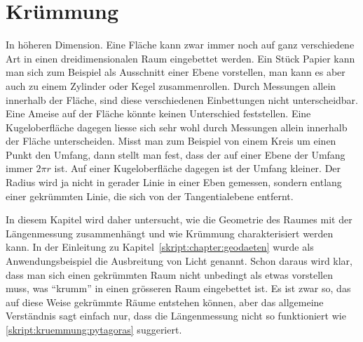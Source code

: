 %
%
%
\chapter{Krümmung%
\label{skript:chapter:kruemmung}}
\rhead{}

In höheren Dimension.
Eine Fläche kann zwar immer noch auf ganz verschiedene Art in
einen dreidimensionalen Raum eingebettet werden.
Ein Stück Papier kann man sich zum Beispiel als Ausschnitt einer
Ebene vorstellen, man kann es aber auch zu einem Zylinder oder
Kegel zusammenrollen.
Durch Messungen allein innerhalb der Fläche, sind diese verschiedenen
Einbettungen nicht unterscheidbar.
Eine Ameise auf der Fläche könnte keinen Unterschied feststellen.
Eine Kugeloberfläche dagegen liesse sich sehr wohl durch Messungen
allein innerhalb der Fläche unterscheiden.
Misst man zum Beispiel von einem Kreis um einen Punkt den Umfang,
dann stellt man fest, dass der auf einer Ebene der Umfang immer $2\pi r$ ist.
Auf einer Kugeloberfläche dagegen ist der Umfang kleiner.
Der Radius wird ja nicht in gerader Linie in einer Eben gemessen,
sondern entlang einer gekrümmten Linie, die sich von der Tangentialebene
entfernt.

In diesem Kapitel wird daher untersucht, wie die Geometrie des Raumes
mit der Längenmessung zusammenhängt und wie Krümmung charakterisiert
werden kann.
In der Einleitung zu Kapitel~\ref{skript:chapter:geodaeten} wurde
als Anwendungsbeispiel die Ausbreitung von Licht genannt.
Schon daraus wird klar, dass man sich einen gekrümmten
Raum nicht unbedingt als etwas vorstellen muss, was ``krumm'' in einen
grösseren Raum eingebettet ist. 
Es ist zwar so, das auf diese Weise gekrümmte Räume entstehen können,
aber das allgemeine Verständnis sagt einfach nur, dass die Längenmessung
nicht so funktioniert wie \eqref{skript:kruemmung:pytagoras} suggeriert.




